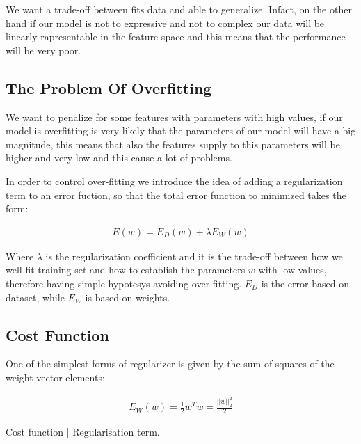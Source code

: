 \noindent[picture]

\noindent We want a trade-off between fits data and able to generalize. Infact, on the other hand if our model is not to expressive and not to complex our data will be linearly rapresentable in the feature space and this means that the performance will be very poor. 

\subsection{The Problem Of Overfitting}
We want to penalize for some features with parameters with high values, if our model is overfitting is very likely that the parameters of our model will have a big magnitude, this means that also the features supply to this parameters will be higher and very low and this cause a lot of problems.

\noindent In order to control over-fitting we introduce the idea of adding a regularization term to an error fuction, so that the total error function to minimized takes the form:

\begin{Equation}[H]
	\centering
	\begin{equation}\label{eq:fullreg}
		\begin{aligned}
			E(w) = E_D(w) + \lambda E_W(w)
		\end{aligned}
	\end{equation}
\end{Equation}

\noindent Where $\lambda$ is the regularization coefficient and it is the trade-off between how we well fit training set and how to establish the parameters $w$ with low values, therefore having simple hypotesys avoiding over-fitting. $E_D$ is the error based on dataset, while $E_W$ is based on weights.

\subsection{Cost Function}
\label{subsec:regcostfun}

One of the simplest forms of regularizer is given by the sum-of-squares of the weight vector elements:
\begin{Equation}[H]
	\centering
	\begin{equation}\label{eq:regularizer}
		\begin{aligned}
			E_W(w) = \frac{1}{2} w^T w = \frac{||w||^2_2}{2}
		\end{aligned}
	\end{equation}
	\caption[Cost function | Regularisation term.]{Cost function | Regularisation term.}
\end{Equation}

